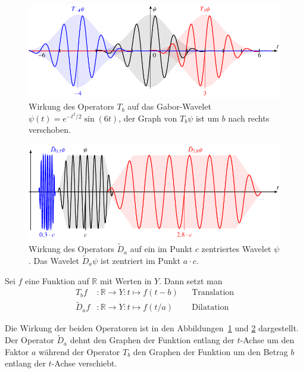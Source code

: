 \begin{figure}
\centering
\includegraphics[width=\hsize]{chapters/1-geometrie/images/translation.pdf}
\caption{Wirkung des Operators $T_b$ auf das Gabor-Wavelet
$\psi(t) = e^{-t^2/2}\sin(6t)$,
der Graph von $T_b\psi$ ist um $b$ nach rechts verschoben.
\label{geometrie:Tb:image}}
\end{figure}
\begin{figure}
\centering
\includegraphics[width=\hsize]{chapters/1-geometrie/images/dilatation.pdf}
\caption{Wirkung des Operators $\tilde{D}_a$ auf ein im Punkt $c$ zentriertes
Wavelet $\psi$. Das Wavelet $\tilde{D}_a\psi$ ist zentriert im Punkt $a\cdot c$.
\label{geometrie:Da:image}}
\end{figure}

\begin{definition}
Sei $f$ eine Funktion auf $\mathbb R$ mit Werten in $Y$.
Dann setzt man
\begin{align*}
T_bf&\colon \mathbb R \to Y: t\mapsto f(t-b)&&\text{Translation}
\\
\tilde{D}_af&\colon \mathbb R \to Y: t\mapsto f(t/a)&&\text{Dilatation}
\end{align*}
\end{definition}

Die Wirkung der beiden Operatoren ist in den
Abbildungen~\ref{geometrie:Tb:image} und \ref{geometrie:Da:image} dargestellt.
Der Operator $\tilde{D}_a$ dehnt den Graphen der Funktion entlang der
$t$-Achse um den Faktor $a$ während der Operator $T_b$ den Graphen
der Funktion um den Betrag $b$ entlang der $t$-Achse verschiebt.

